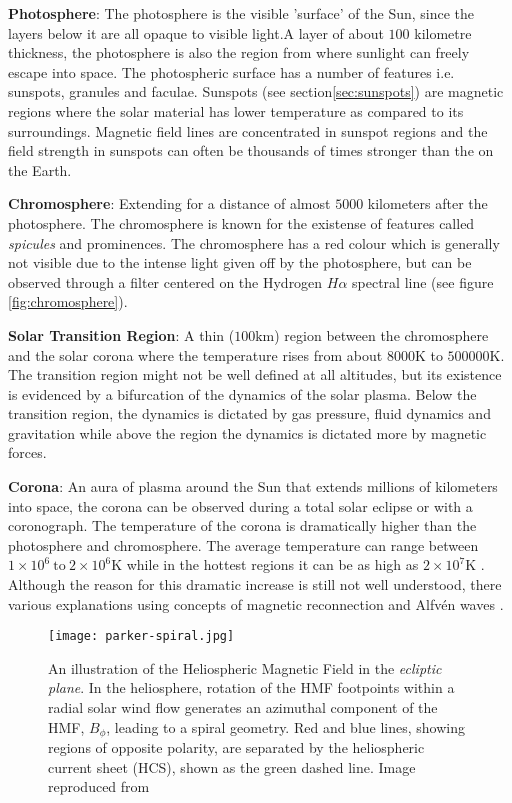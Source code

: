 \textbf{Photosphere}: The photosphere is the visible 'surface' of the Sun, since the layers below it are all opaque to 
visible light.A layer of about $100$ kilometre thickness, the photosphere is also the region from where sunlight can freely 
escape into space. The photospheric surface has a number of features i.e. sunspots, granules and faculae. 
Sunspots (see section\ref{sec:sunspots}) are magnetic regions where the solar material has lower temperature as compared 
to its surroundings. Magnetic field lines are concentrated in sunspot regions and the field strength in sunspots can often 
be thousands of times stronger than the on the Earth.

\textbf{Chromosphere}: Extending for a distance of almost $5000$ kilometers after the photosphere. The chromosphere is 
known for the existense of features called \emph{spicules} and prominences. The chromosphere has a red colour which 
is generally not visible due to the intense light given off by the photosphere, but can be observed through 
a filter centered on the Hydrogen $H\alpha$ spectral line (see figure \ref{fig:chromosphere}). 

\textbf{Solar Transition Region}: A thin ($100 \text{km}$) region between the chromosphere and the solar corona 
where the temperature rises from about $8000 \text{K}$ to $500000 \text{K}$. The transition region might not be well 
defined at all altitudes, but its existence is evidenced by a bifurcation of the dynamics of the solar plasma. 
Below the transition region, the dynamics is dictated by gas pressure, fluid dynamics and gravitation while 
above the region the dynamics is dictated more by magnetic forces.

\textbf{Corona}: An aura of plasma around the Sun that extends millions of kilometers into space, the corona can be 
observed during a total solar eclipse or with a coronograph. The temperature of the corona is dramatically higher 
than the photosphere and chromosphere. The average temperature can range between 
$1 \times 10^6 \ \text{to} \ 2 \times 10^6 \text{K}$ while in the hottest regions it can be as high as 
$2 \times 10^7 \text{K}$ \citep{SolarCorona}. Although the reason for this dramatic increase is still 
not well understood, there various explanations using concepts of magnetic reconnection 
\citep{russell2001solar,SolarCorona} and Alfv\'en waves \citep{AlfvenCorona}.

\begin{figure}
    \noindent\texttt{[image: parker-spiral.jpg]}
    \caption{\small An illustration of the Heliospheric Magnetic Field in the \emph{ecliptic plane}. 
    In the heliosphere, rotation of the HMF footpoints within a radial solar wind flow generates an azimuthal 
    component of the HMF, $B_{\phi}$, leading to a spiral geometry. Red and blue lines, 
    showing regions of opposite polarity, are separated by the heliospheric current sheet (HCS), 
    shown as the green dashed line.
    Image reproduced from \citet{Owens2013}}
    \label{fig:parkerspiral}
\end{figure}

